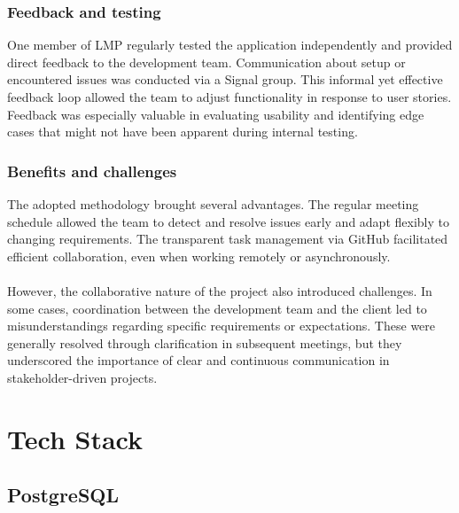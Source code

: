 \documentclass[a4paper,12pt]{report}
\begin{document}
\subsection{Feedback and testing}
One member of LMP regularly tested the application independently and provided direct feedback to the development team. Communication about setup or encountered issues was conducted via a Signal group. This informal yet effective feedback loop allowed the team to adjust functionality in response to user stories. Feedback was especially valuable in evaluating usability and identifying edge cases that might not have been apparent during internal testing.
\subsection{Benefits and challenges}
The adopted methodology brought several advantages. The regular meeting schedule allowed the team to detect and resolve issues early and adapt flexibly to changing requirements. The transparent task management via GitHub facilitated efficient collaboration, even when working remotely or asynchronously.\\\\
However, the collaborative nature of the project also introduced challenges. In some cases, coordination between the development team and the client led to misunderstandings regarding specific requirements or expectations. These were generally resolved through clarification in subsequent meetings, but they underscored the importance of clear and continuous communication in stakeholder-driven projects. 

\chapter{Tech Stack}
\section{PostgreSQL}
\end{document}
